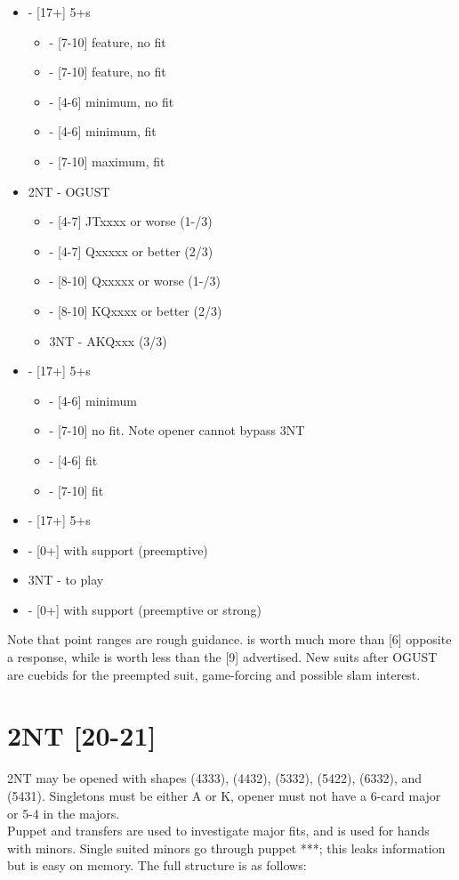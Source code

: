 \documentclass[12pt]{report}
\newcommand{\n}{\\}
\newcommand{\q}[1]{\multido{}{#1}{\qquad}}
\newcommand{\ul}[1]{\begin{itemize}#1\end{itemize}}
\newcommand{\li}[1]{\item[~] \q{#1}}
\newcommand{\bidsection}[2]{\section{\texorpdfstring{#1}{#2}}}
\begin{document}
    \ul{
        \li0  - [17+] 5+\sp{}s \ul{
            \li0 \cl3 - [7-10] feature, no fit
            \li0 \di3 - [7-10] feature, no fit
            \li0 \he3 - [4-6] minimum, no fit
            \li0 \sp3 - [4-6] minimum, fit
            \li0 \sp4 - [7-10] maximum, fit
        }

        \li0 2NT - OGUST \ul{
            \li0 \cl3 - [4-7] JTxxxx or worse (1-/3)
            \li0 \di3 - [4-7] Qxxxxx or better (2/3)
            \li0 \sp3 - [8-10] Qxxxxx or worse (1-/3)
            \li0 \sp3 - [8-10] KQxxxx or better (2/3)
            \li0 3NT - AKQxxx (3/3)
        }

        \li0 \cl3 - [17+] 5+\cl{}s \ul{
            \li0 \he3 - [4-6] minimum
            \li0 \sp3 - [7-10] no fit.  Note opener cannot bypass 3NT
            \li0 \cl4 - [4-6] fit
            \li0 \cl5 - [7-10] fit
        }

        \li0 \di3 - [17+] 5+\di{}s
        \li0 \he3 - [0+] with support (preemptive)
        \li0 3NT - to play
        \li0 \he4 - [0+] with support (preemptive or strong)
    }

    Note that point ranges are rough guidance.  is worth much more than [6] opposite a  response, while  is worth less than the [9] advertised.  New suits after OGUST are cuebids for the preempted suit, game-forcing and possible slam interest.

\bidsection{2NT [20-21]}{2NT [20-21]} \label{2:10}

    2NT may be opened with shapes (4333), (4432), (5332), (5422), (6332), and (5431).  Singletons must be either A or K, opener must not have a 6-card major or 5-4 in the majors.\n

    Puppet and transfers are used to investigate major fits, and  is used for hands with minors.  Single suited minors go through puppet ***; this leaks information but is easy on memory. The full structure is as follows:

\end{document}
